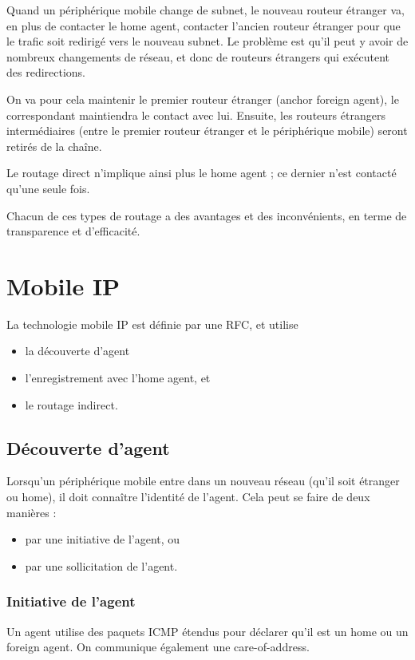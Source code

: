 		Quand un périphérique mobile change de subnet, le nouveau routeur étranger va, en plus de contacter le home agent, contacter l'ancien routeur étranger pour que le trafic soit redirigé vers le nouveau subnet. Le problème est qu'il peut y avoir de nombreux changements de réseau, et donc de routeurs étrangers qui exécutent des redirections.
  
		On va pour cela maintenir le premier routeur étranger (anchor foreign agent), le correspondant maintiendra le contact avec lui. Ensuite, les routeurs étrangers intermédiaires (entre le premier routeur étranger et le périphérique mobile) seront retirés de la chaîne.
  		
		
		Le routage direct n'implique ainsi plus le home agent ; ce dernier n'est contacté qu'une seule fois.
  
		Chacun de ces types de routage a des avantages et des inconvénients, en terme de transparence et d'efficacité.
  

	\section{Mobile IP}
		
	La technologie mobile IP est définie par une RFC, et utilise
		
	\begin{itemize}
		\item la découverte d'agent
		\item l'enregistrement avec l'home agent, et
		\item le routage indirect.
	\end{itemize}
	
		\subsection{Découverte d'agent}
	
		Lorsqu'un périphérique mobile entre dans un nouveau réseau (qu'il soit étranger ou home), il doit connaître l'identité de l'agent. Cela peut se faire de deux manières :
		
		\begin{itemize}
			\item par une initiative de l'agent, ou
			\item par une sollicitation de l'agent.
		\end{itemize}
  	
  			\subsubsection{Initiative de l'agent}
			Un agent utilise des paquets ICMP étendus pour déclarer qu'il est un home ou un foreign agent. On communique également une care-of-address.
  	
